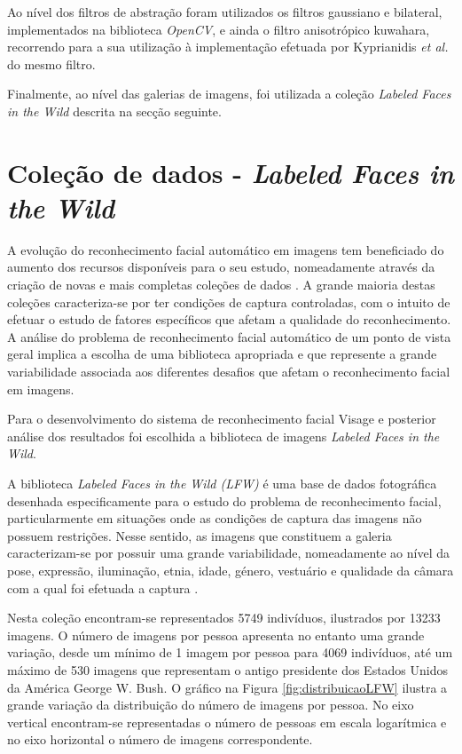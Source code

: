 Ao nível dos filtros de abstração foram utilizados os filtros gaussiano e bilateral, implementados na biblioteca \textit{OpenCV}, e ainda o filtro anisotrópico kuwahara, recorrendo para a sua utilização à implementação efetuada por Kyprianidis \textit{et al.} \cite{Kyprianidis2009} do mesmo filtro.

Finalmente, ao nível das galerias de imagens, foi utilizada a coleção \textit{Labeled Faces in the Wild} descrita na secção seguinte.


\section{Coleção de dados - \textit{Labeled Faces in the Wild}} \label{sec:lfw}

A evolução do reconhecimento facial automático em imagens tem beneficiado do aumento dos recursos disponíveis para o seu estudo, nomeadamente através da criação de novas e mais completas coleções de dados \cite{Huang2007}. A grande maioria destas coleções caracteriza-se por ter condições de captura controladas, com o intuito de efetuar o estudo de fatores específicos que afetam a qualidade do reconhecimento. A análise do problema de reconhecimento facial automático de um ponto de vista geral implica a escolha de uma biblioteca apropriada e que represente a grande variabilidade associada aos diferentes desafios que afetam o reconhecimento facial em imagens.

Para o desenvolvimento do sistema de reconhecimento facial Visage e posterior análise dos resultados foi escolhida a biblioteca de imagens \textit{Labeled Faces in the Wild}.

A biblioteca \textit{Labeled Faces in the Wild (LFW)} é uma base de dados fotográfica desenhada especificamente para o estudo do problema de reconhecimento facial, particularmente em situações onde as condições de captura das imagens não possuem restrições. Nesse sentido, as imagens que constituem a galeria caracterizam-se por possuir uma grande variabilidade, nomeadamente ao nível da pose, expressão, iluminação, etnia, idade, género, vestuário e qualidade da câmara com a qual foi efetuada a captura \cite{Huang2007}.

Nesta coleção encontram-se representados 5749 indivíduos, ilustrados por 13233 imagens. O número de imagens por pessoa apresenta no entanto uma grande variação, desde um mínimo de 1 imagem por pessoa para 4069 indivíduos, até um máximo de 530 imagens que representam o antigo presidente dos Estados Unidos da América George W. Bush. O gráfico na Figura \ref{fig:distribuicaoLFW} ilustra a grande variação da distribuição do número de imagens por pessoa. No eixo vertical encontram-se representadas o número de pessoas em escala logarítmica e no eixo horizontal o número de imagens correspondente.

